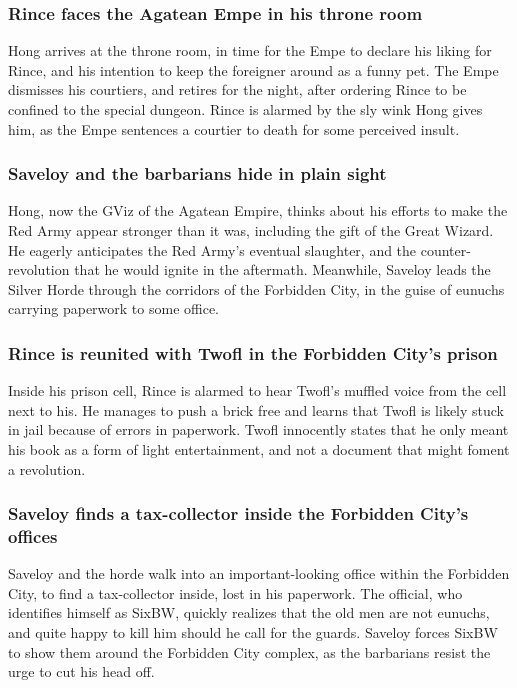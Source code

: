 \subsubsection{\Gls{Rince} faces the Agatean \Gls{Empe} in his throne room}
\Gls{Hong} arrives at the throne room, in time for the \Gls{Empe} to declare his liking for
\Gls{Rince}, and his intention to keep the foreigner around as a funny pet. The \Gls{Empe} dismisses
his courtiers, and retires for the night, after ordering \Gls{Rince} to be confined to the special
dungeon. \Gls{Rince} is alarmed by the sly wink \Gls{Hong} gives him, as the \Gls{Empe} sentences
a courtier to death for some perceived insult.

\subsubsection{\Gls{Saveloy} and the barbarians hide in plain sight}
\Gls{Hong}, now the \Gls{GViz} of the Agatean Empire, thinks about his efforts to make the Red Army
appear stronger than it was, including the gift of the Great Wizard. He eagerly anticipates the
Red Army's eventual slaughter, and the counter-revolution that he would ignite in the aftermath.
Meanwhile, \Gls{Saveloy} leads the Silver Horde through the corridors of the Forbidden City, in the
guise of eunuchs carrying paperwork to some office.

\subsubsection{\Gls{Rince} is reunited with \Gls{Twofl} in the Forbidden City's prison}
Inside his prison cell, \Gls{Rince} is alarmed to hear \Gls{Twofl}'s muffled voice from the cell
next to his. He manages to push a brick free and learns that \Gls{Twofl} is likely stuck in jail
because of errors in paperwork. \Gls{Twofl} innocently states that he only meant his book as a form
of light entertainment, and not a document that might foment a revolution.

\subsubsection{\Gls{Saveloy} finds a tax-collector inside the Forbidden City's offices}
\Gls{Saveloy} and the horde walk into an important-looking office within the Forbidden City, to find
a tax-collector inside, lost in his paperwork. The official, who identifies himself as \Gls{SixBW},
quickly realizes that the old men are not eunuchs, and quite happy to kill him should he call for
the guards. \Gls{Saveloy} forces \Gls{SixBW} to show them around the Forbidden City complex, as the
barbarians resist the urge to cut his head off.


